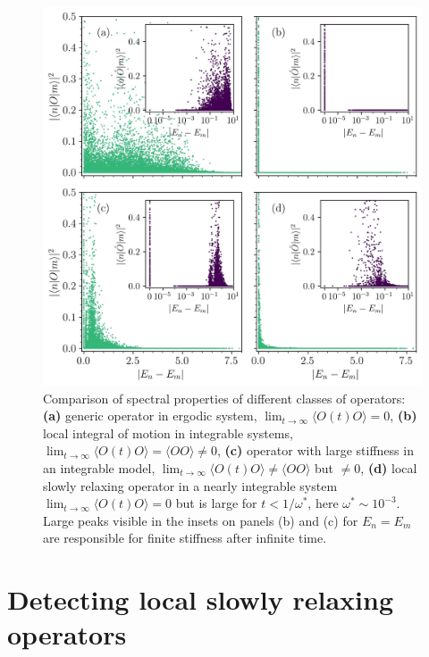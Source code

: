 \begin{figure}[H]
  \centering
  \includegraphics[width=\linewidth]{Figures/types_of_ops.jpg}
  \caption{Comparison of spectral properties of different classes of operators:
  \textbf{(a)} generic operator in ergodic system, \(\lim_{t \to \infty} \langle O(t)O \rangle = 0\),
  \textbf{(b)} local integral of motion in integrable systems, \(\lim_{t \to \infty} \langle O(t)O \rangle = \langle OO \rangle \neq 0  \),
  \textbf{(c)} operator with large stiffness in an integrable model, \(\lim_{t \to \infty} \langle O(t)O \rangle \neq \langle OO \rangle \) but
  \(\neq 0\),
  \textbf{(d)} local slowly relaxing operator in a nearly integrable system \(\lim_{t \to \infty} \langle O(t)O \rangle = 0 \) but
  is large for \(t < 1/\omega^{\ast}  \), here \(\omega^{\ast} \sim 10^{-3} \). 
  Large peaks visible in the insets on panels (b) and (c) for \(E_n = E_m\) are responsible for finite stiffness after infinite time. 
  }
  \label{fig:types_of_ops}
\end{figure}



\section{Detecting local slowly relaxing operators \label{sec:slowly_relaxing_operators}}
